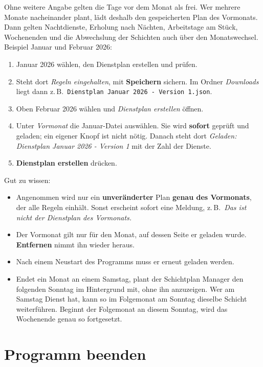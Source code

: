 \documentclass[11pt]{combiArticle}
\newcommand{\code}[1]{\texttt{#1}}
\newcommand{\knopf}[1]{\textbf{#1}}
\begin{document}
Ohne weitere Angabe gelten die Tage vor dem Monat als frei. Wer mehrere Monate nacheinander plant, lädt deshalb
den gespeicherten Plan des Vormonats. Dann gelten Nachtdienste, Erholung nach Nächten, Arbeitstage am Stück,
Wochenenden und die Abwechslung der Schichten auch über den Monatswechsel. Beispiel Januar und Februar 2026:
\begin{enumerate}
  \item Januar 2026 wählen, den Dienstplan erstellen und prüfen.
  \item Steht dort \emph{Regeln eingehalten}, mit \knopf{Speichern} sichern. Im Ordner \emph{Downloads} liegt dann
        z.\,B.\ \code{Dienstplan Januar 2026 - Version 1.json}.
  \item Oben Februar 2026 wählen und \emph{Dienstplan erstellen} öffnen.
  \item Unter \emph{Vormonat} die Januar-Datei auswählen. Sie wird \textbf{sofort} geprüft und geladen; ein eigener
        Knopf ist nicht nötig. Danach steht dort \emph{Geladen: Dienstplan Januar 2026 - Version 1} mit der Zahl
        der Dienste.
  \item \knopf{Dienstplan erstellen} drücken.
\end{enumerate}
Gut zu wissen:
\begin{itemize}
  \item Angenommen wird nur ein \textbf{unveränderter} Plan \textbf{genau des Vormonats}, der alle Regeln
        einhält. Sonst erscheint sofort eine Meldung, z.\,B.\ \emph{Das ist nicht der Dienstplan des Vormonats.}
  \item Der Vormonat gilt nur für den Monat, auf dessen Seite er geladen wurde. \knopf{Entfernen} nimmt ihn wieder
        heraus.
  \item Nach einem Neustart des Programms muss er erneut geladen werden.
  \item Endet ein Monat an einem Samstag, plant der Schichtplan Manager den folgenden Sonntag im Hintergrund mit,
        ohne ihn anzuzeigen. Wer am Samstag Dienst hat, kann so im Folgemonat am Sonntag dieselbe Schicht weiterführen.
        Beginnt der Folgemonat an diesem Sonntag, wird das Wochenende genau so fortgesetzt.
\end{itemize}

\section{Programm beenden}\label{sec:beenden}
\end{document}
